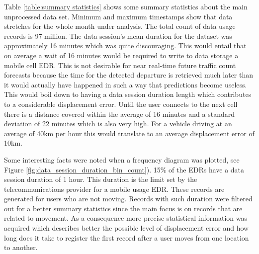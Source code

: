 \documentclass[12pt, a4paper]{report}
\theoremstyle{definition}
\theoremstyle{definition}%
\theoremstyle{definition}%
\theoremstyle{definition}%
\theoremstyle{definition}%
\theoremstyle{definition}%
\begin{document}
Table \ref{table:summary statistics} shows some summary statistics about the main unprocessed data set. Minimum and maximum timestamps show that data stretches for the whole month under analysis. The total count of data usage records is 97 million. The data session's mean duration for the dataset was approximately 16 minutes which was quite discouraging. This would entail that on average a wait of 16 minutes would be required to write to data storage a mobile cell EDR. This is not desirable for near real-time future traffic count forecasts because the time for the detected departure is retrieved much later than it would actually have happened in such a way that predictions become useless. This would boil down to having a data session duration length which contributes to a considerable displacement error. Until the user connects to the next cell there is a distance covered within the average of 16 minutes and a standard deviation of 22 minutes which is also very high. For a vehicle driving at an average of 40km per hour this would translate to an average displacement error of 10km. 


\begin{table}[h]
	\centering
	\caption{Basic summary statistics of main EDR dataset.} 
	\label{table:summary statistics}
\end{table}


Some interesting facts were noted when a frequency diagram was plotted, see Figure \ref{fig:data_session_duration_bin_count}). 15\% of the EDRs have a data session duration of 1 hour. This duration is the limit set by the telecommunications provider for a mobile usage EDR. These records are generated for users who are not moving. Records with such duration were filtered out for a better summary statistics since the main focus is on records that are related to movement. As a consequence more precise statistical information was acquired which describes better the possible level of displacement error and how long does it take to register the first record after a user moves from one location to another.
\end{document}
